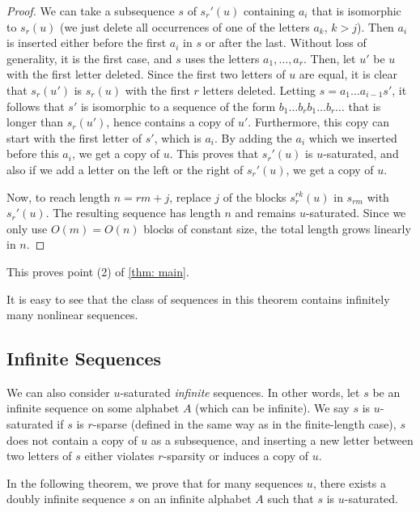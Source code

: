\documentclass[12pt]{amsart}
\theoremstyle{definition}
\numberwithin{equation}{section}
\numberwithin{table}{thm}
\begin{document}
\begin{proof}
We can take a subsequence $s$ of $s_r'(u)$ containing $a_i$ that is isomorphic to $s_r(u)$ (we just delete all occurrences of one of the letters $a_k$, $k>j$). Then $a_i$ is inserted either before the first $a_i$ in $s$ or after the last. Without loss of generality, it is the first case, and $s$ uses the letters $a_1,\dots, a_{r}$. Then, let $u'$ be $u$ with the first letter deleted. Since the first two letters of $u$ are equal, it is clear that $s_r(u')$ is $s_r(u)$ with the first $r$ letters deleted. Letting $s = a_1\dots a_{i-1}s'$, it follows that $s'$ is isomorphic to a sequence of the form $b_1\dots b_r b_1\dots b_r\dots$ that is longer than $s_r(u')$, hence contains a copy of $u'$. Furthermore, this copy can start with the first letter of $s'$, which is $a_i$. By adding the $a_i$ which we inserted before this $a_i$, we get a copy of $u$. This proves that $s_r'(u)$ is $u$-saturated, and also if we add a letter on the left or the right of $s_r'(u)$, we get a copy of $u$.

Now, to reach length $n = rm + j$, replace $j$ of the blocks $s_r^{rk}(u)$ in $s_{rm}$ with $s_r'(u)$. The resulting sequence has length $n$ and remains $u$-saturated. Since we only use $O(m) = O(n)$ blocks of constant size, the total length grows linearly in $n$.
\end{proof}

This proves point (2) of \cref{thm: main}.



It is easy to see that the class of sequences in this theorem contains infinitely many nonlinear sequences. 

\subsection{Infinite Sequences}
We can also consider $u$-saturated \textit{infinite} sequences. In other words, let $s$ be an infinite sequence on some alphabet $A$ (which can be infinite). We say $s$ is $u$-saturated if $s$ is $r$-sparse (defined in the same way as in the finite-length case), $s$ does not contain a copy of $u$ as a subsequence, and inserting a new letter between two letters of $s$ either violates $r$-sparsity or induces a copy of $u$.

In the following theorem, we prove that for many sequences $u$, there exists a doubly infinite sequence $s$ on an infinite alphabet $A$ such that $s$ is $u$-saturated.
\end{document}
